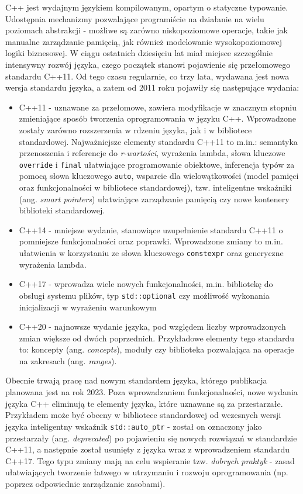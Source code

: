 C++ jest wydajnym językiem kompilowanym, opartym o statyczne typowanie. Udostępnia mechanizmy pozwalające programiście na działanie na wielu poziomach abstrakcji - możliwe są zarówno niskopoziomowe operacje, takie jak manualne zarządzanie pamięcią, jak również modelowanie wysokopoziomowej logiki biznesowej. W ciągu ostatnich dziesięciu lat miał miejsce szczególnie intensywny rozwój języka, czego początek stanowi pojawienie się przełomowego standardu C++11. Od tego czasu regularnie, co trzy lata, wydawana jest nowa wersja standardu języka, a zatem od 2011 roku pojawiły się następujące wydania:
\begin{itemize}
\item C++11 - uznawane za przełomowe, zawiera modyfikacje w znacznym stopniu zmieniające sposób tworzenia oprogramowania w języku C++. Wprowadzone zostały zarówno rozszerzenia w rdzeniu języka, jak i w bibliotece standardowej. Najważniejsze elementy standardu C++11 to m.in.: semantyka przenoszenia i referencje do \emph{r-wartości}, wyrażenia lambda, słowa kluczowe \lstinline{override} i \lstinline{final} ułatwiające programowanie obiektowe, inferencja typów za pomocą słowa kluczowego \lstinline{auto}, wsparcie dla wielowątkowości (model pamięci oraz funkcjonalności w bibliotece standardowej), tzw. inteligentne wskaźniki (ang. \emph{smart pointers}) ułatwiające zarządzanie pamięcią czy nowe kontenery biblioteki standardowej.
\item C++14 - mniejsze wydanie, stanowiące uzupełnienie standardu C++11 o pomniejsze funkcjonalności oraz poprawki. Wprowadzone zmiany to m.in. ułatwienia w korzystaniu ze słowa kluczowego \lstinline{constexpr} oraz generyczne wyrażenia lambda. 
\item C++17 - wprowadza wiele nowych funkcjonalności, m.in. bibliotekę do obsługi systemu plików, typ \lstinline{std::optional} czy możliwość wykonania inicjalizacji w wyrażeniu warunkowym
\item C++20 - najnowsze wydanie języka, pod względem liczby wprowadzonych zmian większe od dwóch poprzednich. Przykładowe elementy tego standardu to: koncepty (ang. \emph{concepts}), moduły czy biblioteka pozwalająca na operacje na zakresach (ang. \emph{ranges}).
\end{itemize}

Obecnie trwają pracę nad nowym standardem języka, którego publikacja planowana jest na rok 2023. Poza wprowadzaniem funkcjonalności, nowe wydania języka C++ eliminują te elementy języka, które uznawane są za przestarzałe. Przykładem może być obecny w bibliotece standardowej od wczesnych wersji języka inteligentny wskaźnik \lstinline{std::auto_ptr} - został on oznaczony jako przestarzały (ang. \emph{deprecated}) po pojawieniu się nowych rozwiązań w standardzie C++11, a następnie został usunięty z języka wraz z wprowadzeniem standardu C++17. Tego typu zmiany mają na celu wspieranie tzw. \emph{dobrych praktyk} - zasad ułatwiających tworzenie łatwego w utrzymaniu i rozwoju oprogramowania (np. poprzez odpowiednie zarządzanie zasobami).

